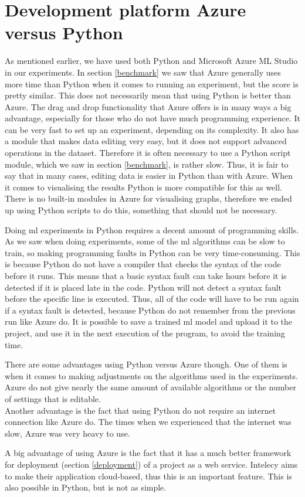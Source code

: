 \documentclass[english, a4paper]{report}
\begin{document}
{    \section{Development platform Azure versus Python}
    {
        As mentioned earlier, we have used both Python and Microsoft Azure ML Studio in our experiments. In section \ref{benchmark} we saw that Azure generally uses more time than Python when it comes to running an experiment, but the score is pretty similar. This does not necessarily mean that using Python is better than Azure. The drag and drop functionality that Azure offers is in many ways a big advantage, especially for those who do not have much programming experience. It can be very fast to set up an experiment, depending on its complexity. It also has a module that makes data editing very easy, but it does not support advanced operations in the dataset. Therefore it is often necessary to use a Python script module, which we saw in section \ref{benchmark}, is rather slow. Thus, it is fair to say that in many cases, editing data is easier in Python than with Azure. 
        When it comes to visualising the results Python is more compatible for this as well. There is no built-in modules in Azure for visualising graphs, therefore we ended up using Python scripts to do this, something that should not be necessary. 
        \par 
        Doing \gls{ml} experiments in Python requires a decent amount of programming skills. As we saw when doing experiments, some of the \gls{ml} algorithms can be slow to train, so making programming faults in Python can be very time-consuming. This is because Python do not have a compiler that checks the syntax of the code before it runs. This means that a basic syntax fault can take hours before it is detected if it is placed late in the code. Python will not detect a syntax fault before the specific line is executed. Thus, all of the code will have to be run again if a syntax fault is detected, because Python do not remember from the previous run like Azure do. It is possible to save a trained \gls{ml} model and upload it to the project, and use it in the next execution of the program, to avoid the training time.
        \par 
        There are some advantages using Python versus Azure though. One of them is when it comes to making adjustments on the algorithms used in the experiments. Azure do not give nearly the same amount of available algorithms or the number of settings that is editable. \\
        Another advantage is the fact that using Python do not require an internet connection like Azure do. The times when we experienced that the internet was slow, Azure was very heavy to use.
        \par 
        A big advantage of using Azure is the fact that it has a much better framework for deployment (section \ref{deployment}) of a project as a web service. Intelecy aims to make their application cloud-based, thus this is an important feature. This is also possible in Python, but is not as simple.
    }
    
}
\end{document}
